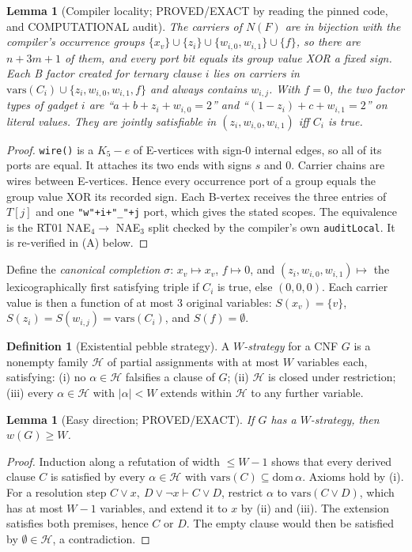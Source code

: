\documentclass[11pt]{article}
\newtheorem{lemma}[theorem]{Lemma}
\theoremstyle{definition}
\newtheorem{definition}[theorem]{Definition}
\begin{document}
\begin{lemma}[Compiler locality; PROVED/EXACT by reading the pinned code, and COMPUTATIONAL audit]\label{lem:loc}
The carriers of $N(F)$ are in bijection with the compiler's occurrence groups $\{x_v\}\cup\{z_i\}\cup\{w_{i,0},w_{i,1}\}\cup\{f\}$, so there are $n+3m+1$ of them, and every port bit equals its group value XOR a fixed sign. Each B factor created for ternary clause $i$ lies on carriers in $\mathrm{vars}(C_i)\cup\{z_i,w_{i,0},w_{i,1},f\}$ and always contains $w_{i,j}$. With $f=0$, the two factor types of gadget $i$ are ``$a+b+z_i+w_{i,0}=2$'' and ``$(1-z_i)+c+w_{i,1}=2$'' on literal values. They are jointly satisfiable in $(z_i,w_{i,0},w_{i,1})$ iff $C_i$ is true.
\end{lemma}
\begin{proof}
\texttt{wire()} is a $K_5-e$ of E-vertices with sign-0 internal edges, so all of its ports are equal. It attaches its two ends with signs $s$ and $0$. Carrier chains are wires between E-vertices. Hence every occurrence port of a group equals the group value XOR its recorded sign. Each B-vertex receives the three entries of $T[j]$ and one \texttt{"w"+i+"\_"+j} port, which gives the stated scopes. The equivalence is the RT01 NAE$_4\to$ NAE$_3$ split checked by the compiler's own \texttt{auditLocal}. It is re-verified in (A) below.
\end{proof}

\noindent Define the \emph{canonical completion} $\sigma$: $x_v\mapsto x_v$, $f\mapsto0$, and $(z_i,w_{i,0},w_{i,1})\mapsto$ the lexicographically first satisfying triple if $C_i$ is true, else $(0,0,0)$. Each carrier value is then a function of at most $3$ original variables: $S(x_v)=\{v\}$, $S(z_i)=S(w_{i,j})=\mathrm{vars}(C_i)$, and $S(f)=\emptyset$.

\begin{definition}[Existential pebble strategy]
A \emph{$W$-strategy} for a CNF $G$ is a nonempty family $\mathcal H$ of partial assignments with at most $W$ variables each, satisfying:
(i) no $\alpha\in\mathcal H$ falsifies a clause of $G$;
(ii) $\mathcal H$ is closed under restriction;
(iii) every $\alpha\in\mathcal H$ with $|\alpha|<W$ extends within $\mathcal H$ to any further variable.
\end{definition}

\begin{lemma}[Easy direction; PROVED/EXACT]\label{lem:easy}
If $G$ has a $W$-strategy, then $w(G)\ge W$.
\end{lemma}
\begin{proof}
Induction along a refutation of width $\le W-1$ shows that every derived clause $C$ is satisfied by every $\alpha\in\mathcal H$ with $\mathrm{vars}(C)\subseteq\mathrm{dom}\,\alpha$. Axioms hold by (i). For a resolution step $C\vee x,\ D\vee\neg x\vdash C\vee D$, restrict $\alpha$ to $\mathrm{vars}(C\vee D)$, which has at most $W-1$ variables, and extend it to $x$ by (ii) and (iii). The extension satisfies both premises, hence $C$ or $D$. The empty clause would then be satisfied by $\emptyset\in\mathcal H$, a contradiction.
\end{proof}
\end{document}

